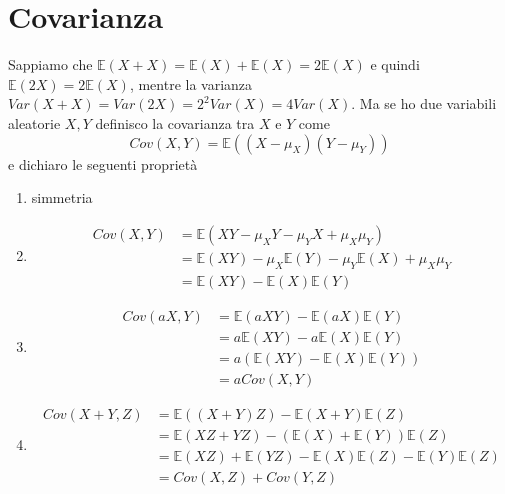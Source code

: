 \documentclass[11pt]{report}
\begin{document}
\section{Covarianza}
Sappiamo che $\mathbb{E}(X + X) = \mathbb{E}(X) + \mathbb{E}(X) = 2\mathbb{E}(X)$ e quindi $\mathbb{E}(2X) = 2\mathbb{E}(X)$, mentre la varianza $Var(X + X) = Var(2X) = 2^2Var(X) = 4Var(X)$. Ma se ho due variabili aleatorie $X,Y$ definisco la covarianza tra $X$ e $Y$ come
\begin{equation}
    Cov(X,Y) = \mathbb{E}((X - \mu_X)(Y - \mu_Y))
\end{equation}
e dichiaro le seguenti proprietà
\begin{enumerate}
	\item simmetria
	\item
    \begin{equation}
        \begin{split}
            Cov(X,Y) & = \mathbb{E}(XY - \mu_XY - \mu_YX + \mu_X\mu_Y)\\
    		& = \mathbb{E}(XY) - \mu_X\mathbb{E}(Y) - \mu_Y\mathbb{E}(X) + \mu_X\mu_Y\\
    		& = \mathbb{E}(XY) - \mathbb{E}(X)\mathbb{E}(Y)
        \end{split}
    \end{equation}
	\item
        \begin{equation}
            \begin{split}
                Cov(aX,Y) & = \mathbb{E}(aXY) - \mathbb{E}(aX)\mathbb{E}(Y)\\
        		& = a\mathbb{E}(XY) - a\mathbb{E}(X)\mathbb{E}(Y)\\
        		& = a(\mathbb{E}(XY) - \mathbb{E}(X)\mathbb{E}(Y))\\
        		& = aCov(X,Y)
            \end{split}
        \end{equation}
	\item
        \begin{equation}
            \begin{split}
                Cov(X + Y,Z) & = \mathbb{E}((X+Y)Z) - \mathbb{E}(X+Y)\mathbb{E}(Z)\\
        		& = \mathbb{E}(XZ + YZ) - (\mathbb{E}(X) + \mathbb{E}(Y))\mathbb{E}(Z)\\
        		& = \mathbb{E}(XZ) + \mathbb{E}(YZ) - \mathbb{E}(X)\mathbb{E}(Z) - \mathbb{E}(Y)\mathbb{E}(Z)\\
        		& = Cov(X,Z) + Cov(Y,Z)

\end{split}
\end{equation}
\end{enumerate}
\end{document}
